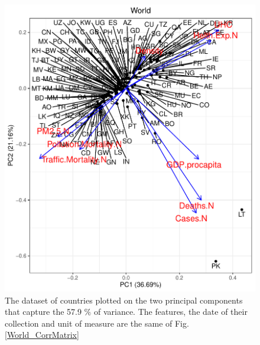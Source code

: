 \documentclass[
12pt, %
a4paper, %
oneside, %
headinclude,footinclude, %
BCOR5mm, %
]{scrartcl}
\begin{document}
\begin{figure}[h]
\begin{center}
\includegraphics[scale=1]{Pic/World_FULLPCA.pdf}
\caption{The dataset of countries plotted on the two principal components that capture the 57.9 $\% $ of variance. The features, the date of their collection and unit of measure are the same of Fig. \ref{World_CorrMatrix}}
\label{World_FULL_PCA}
\end{center}
\end{figure}




\clearpage







\renewcommand{\refname}{\spacedlowsmallcaps{References}} %




\end{document}
